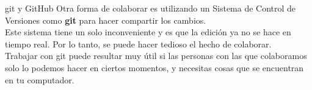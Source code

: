 \documentclass[12pt,aspectratio=43]{beamer}
\begin{document}
\begin{frame}{git y GitHub}{}
Otra forma de colaborar es utilizando un Sistema de Control de Versiones como {\alert{\bf git}} para hacer compartir los cambios.\pause\\[1em]

Este sistema tiene un solo inconveniente y es que la edición ya no se hace en tiempo real. Por lo tanto, se puede hacer tedioso el hecho de colaborar.\pause\\[1em]

Trabajar con git puede resultar muy útil si las personas con las que colaboramos solo lo podemos hacer en ciertos momentos, y necesitas cosas que se encuentran en tu computador.
\end{frame}
\end{document}
